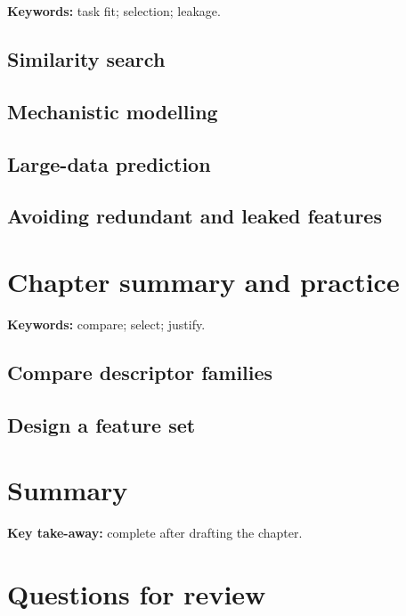 \begin{methodbox}
\textbf{Keywords:} task fit; selection; leakage.
\end{methodbox}

\subsection{Similarity search}


\subsection{Mechanistic modelling}


\subsection{Large-data prediction}


\subsection{Avoiding redundant and leaked features}


\section{Chapter summary and practice}

\begin{notebox}
\textbf{Keywords:} compare; select; justify.
\end{notebox}

\subsection{Compare descriptor families}


\subsection{Design a feature set}


\section{Summary}

\begin{notebox}
\textbf{Key take-away:} complete after drafting the chapter.
\end{notebox}

\section{Questions for review}

\solution{4cm}{%
}
